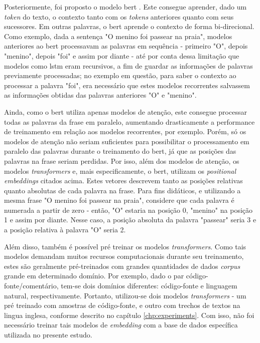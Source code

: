 Posteriormente, foi proposto o modelo \gls{bert} \cite{Devlin2019BERTPO}. Este consegue aprender, dado um \textit{token} do texto, o contexto tanto com os \textit{tokens} anteriores quanto com seus sucessores. Em outras palavras, o \gls{bert} aprende o contexto de forma bi-direcional. Como exemplo, dada a sentença "O menino foi passear na praia", modelos anteriores ao \gls{bert} processavam as palavras em sequência - primeiro "O", depois "menino", depois "foi" e assim por diante - até por conta dessa limitação que modelos como \gls{lstm} eram recursivos, a fim de guardar as informações de palavras previamente processadas; no exemplo em questão, para saber o contexto ao processar a palavra "foi", era necessário que estes modelos recorrentes salvassem as informações obtidas das palavras anteriores "O" e "menino".

Ainda, como o \gls{bert} utiliza apenas modelos de atenção, este consegue processar todas as palavras da frase em paralelo, aumentando drasticamente a performance de treinamento em relação aos modelos recorrentes, por exemplo. Porém, só os modelos de atenção não seriam suficientes para possibilitar o processamento em paralelo das palavras durante o treinamento do \gls{bert}, já que as posições das palavras na frase seriam perdidas. Por isso, além dos modelos de atenção, os modelos \textit{transformers} e, mais especificamente, o \gls{bert}, utilizam os \textit{positional embeddings} citados acima. Estes vetores descrevem tanto as posições relativas quanto absolutas de cada palavra na frase. Para fins didáticos, e utilizando a mesma frase "O menino foi passear na praia", considere que cada palavra é numerada a partir de zero - então, "O" estaria na posição 0, "menino" na posição 1 e assim por diante. Nesse caso, a posição absoluta da palavra "passear" seria 3 e a posição relativa à palavra "O" seria 2.

Além disso, também é possível pré treinar os modelos \textit{transformers}. Como tais modelos demandam muitos recursos computacionais durante seu treinamento, estes são geralmente pré-treinados com grandes quantidades de dados \textit{corpus} grande em determinado domínio. Por exemplo, dado o par código-fonte/comentário, tem-se dois domínios diferentes: código-fonte e linguagem natural, respectivamente. Portanto, utilizou-se dois modelos \textit{transformers} - um pré treinado com amostras de código-fonte, e outro com trechos de textos na lingua inglesa, conforme descrito no capítulo \ref{chp:experiments}. Com isso, não foi necessário treinar tais modelos de \textit{embedding} com a base de dados específica utilizada no presente estudo. 

